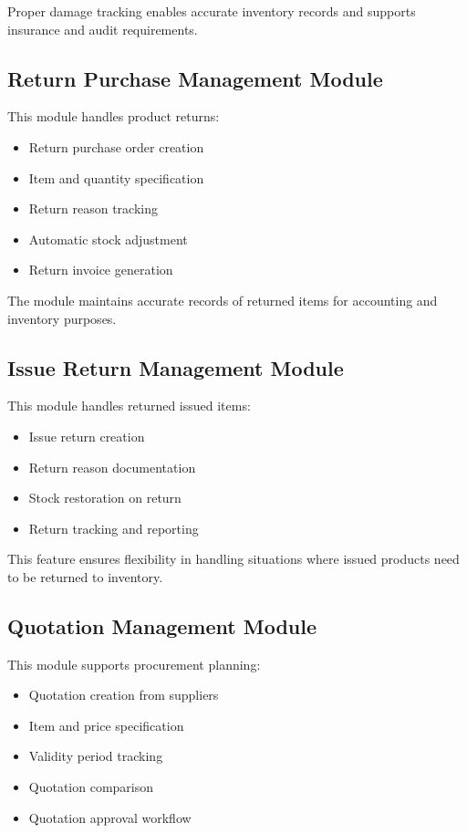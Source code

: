 Proper damage tracking enables accurate inventory records and supports insurance and audit requirements.

\subsection{Return Purchase Management Module}

This module handles product returns:

\begin{itemize}
    \item Return purchase order creation
    \item Item and quantity specification
    \item Return reason tracking
    \item Automatic stock adjustment
    \item Return invoice generation
\end{itemize}

The module maintains accurate records of returned items for accounting and inventory purposes.

\subsection{Issue Return Management Module}

This module handles returned issued items:

\begin{itemize}
    \item Issue return creation
    \item Return reason documentation
    \item Stock restoration on return
    \item Return tracking and reporting
\end{itemize}

This feature ensures flexibility in handling situations where issued products need to be returned to inventory.

\subsection{Quotation Management Module}

This module supports procurement planning:

\begin{itemize}
    \item Quotation creation from suppliers
    \item Item and price specification
    \item Validity period tracking
    \item Quotation comparison
    \item Quotation approval workflow
\end{itemize}

